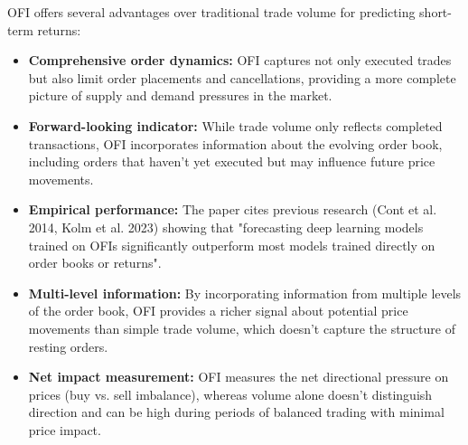 \documentclass{article}
\begin{document}
OFI offers several advantages over traditional trade volume for predicting short-term returns:

\begin{itemize}
    \item \textbf{Comprehensive order dynamics:} OFI captures not only executed trades but also limit order placements and cancellations, providing a more complete picture of supply and demand pressures in the market.
    
    \item \textbf{Forward-looking indicator:} While trade volume only reflects completed transactions, OFI incorporates information about the evolving order book, including orders that haven't yet executed but may influence future price movements.
    
    \item \textbf{Empirical performance:} The paper cites previous research (Cont et al. 2014, Kolm et al. 2023) showing that "forecasting deep learning models trained on OFIs significantly outperform most models trained directly on order books or returns".
    
    \item \textbf{Multi-level information:} By incorporating information from multiple levels of the order book, OFI provides a richer signal about potential price movements than simple trade volume, which doesn't capture the structure of resting orders.
    
    \item \textbf{Net impact measurement:} OFI measures the net directional pressure on prices (buy vs. sell imbalance), whereas volume alone doesn't distinguish direction and can be high during periods of balanced trading with minimal price impact.
\end{itemize}
\end{document}
